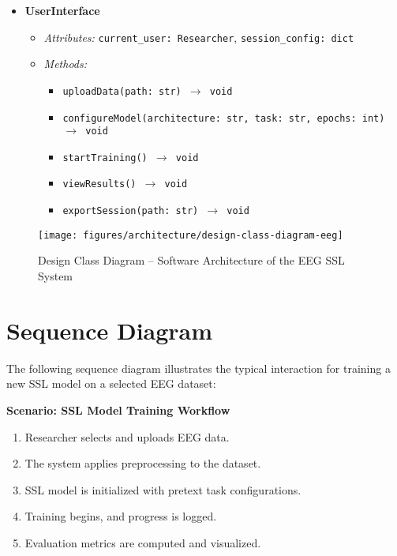 \begin{itemize}
    \item \textbf{UserInterface}
    \begin{itemize}
        \item \textit{Attributes:} \texttt{current\_user: Researcher}, \texttt{session\_config: dict}
        \item \textit{Methods:}
        \begin{itemize}
            \item \texttt{uploadData(path: str) $\rightarrow$ void}
            \item \texttt{configureModel(architecture: str, task: str, epochs: int) $\rightarrow$ void}
            \item \texttt{startTraining() $\rightarrow$ void}
            \item \texttt{viewResults() $\rightarrow$ void}
            \item \texttt{exportSession(path: str) $\rightarrow$ void}
        \end{itemize}
    \end{itemize}
\end{itemize}


\begin{figure}[h!]
    \centering
    \texttt{[image: figures/architecture/design-class-diagram-eeg]}
    \caption{Design Class Diagram – Software Architecture of the EEG SSL System}
    \label{fig:design-class}
\end{figure}


\section{Sequence Diagram}
\label{sec:sequence-diagram}

The following sequence diagram illustrates the typical interaction for training a new SSL model on a selected EEG dataset:

\textbf{Scenario: SSL Model Training Workflow}
\begin{enumerate}
    \item Researcher selects and uploads EEG data.
    \item The system applies preprocessing to the dataset.
    \item SSL model is initialized with pretext task configurations.
    \item Training begins, and progress is logged.
    \item Evaluation metrics are computed and visualized.
\end{enumerate}

